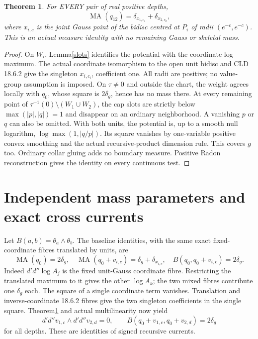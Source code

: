 \documentclass[11pt]{article}
\newtheorem{theorem}{Theorem}
\newcommand{\DD}{d'd''}
\newcommand{\MA}{\operatorname{MA}}
\begin{document}
\begin{theorem}\label{twoatoms}
For EVERY pair of real positive depths,
\[
 \MA(q_{12})=\delta_{x_{1,c_1}}+\delta_{x_{2,c_2}},
\]
where $x_{i,c}$ is the joint Gauss point of the bidisc centred at $P_i$
of radii $(e^{-c},e^{-c})$. This is an actual measure identity with
no remaining Gauss or skeletal mass.
\end{theorem}
\begin{proof}
On $W_i$, Lemma\ref{slots} identifies the potential with the coordinate
log maximum. The actual coordinate isomorphism to the open unit bidisc
and CLD 18.6.2 give the singleton $x_{i,c_i}$, coefficient one.
All radii are positive; no value-group assumption is imposed.
On $\tau\ne0$ and outside the chart, the weight agrees locally with
$q_0$, whose square is $2\delta_g$, hence has no mass there.
At every remaining point of $\tau^{-1}(0)\setminus(W_1\cup W_2)$,
the cap slots are strictly below $\max(|p|,|q|)=1$ and disappear on
an ordinary neighborhood. A vanishing $p$ or $q$ can also be omitted.
With both units, the potential is, up to a smooth null logarithm,
$\log\max(1,|q/p|)$. Its square vanishes by one-variable positive
convex smoothing and the actual recursive-product dimension rule.
This covers $g$ too. Ordinary collar gluing adds no boundary measure.
Positive Radon reconstruction gives the identity on every continuous test.
\end{proof}

\section{Independent mass parameters and exact cross currents}
Let $B(a,b)=\theta_a\wedge\theta_b$. The baseline identities, with
the same exact fixed-coordinate fibres translated by units, are
\[
 \MA(q_0)=2\delta_g,\quad
 \MA(q_0+v_{i,c})=\delta_g+\delta_{x_{i,c}},\quad
 B(q_0,q_0+v_{i,c})=2\delta_g.
\]
Indeed $\DD\log A_j$ is the fixed unit-Gauss coordinate fibre.
Restricting the translated maximum to it gives the other $\log A_k$;
the two mixed fibres contribute one $\delta_g$ each. The square of a
single coordinate term vanishes. Translation and inverse-coordinate
18.6.2 fibres give the two singleton coefficients in the single square.
Theorem\ref{twoatoms} and actual multilinearity now yield
\[
 \DD v_{1,c}\wedge\DD v_{2,d}=0,\qquad
 B(q_0+v_{1,c},q_0+v_{2,d})=2\delta_g
\]
for all depths. These are identities of signed recursive currents.
\end{document}
